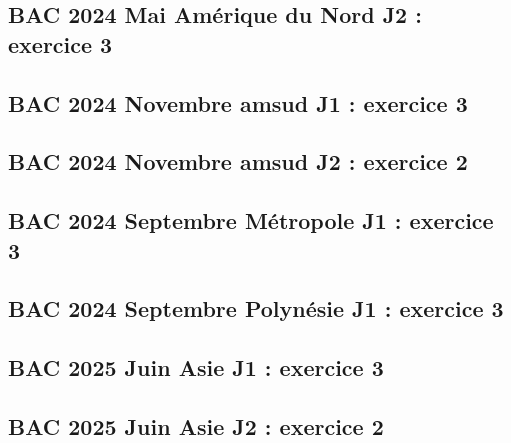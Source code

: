 \documentclass[lang=fr,edition=teacher,layout=sheet]{mxbook}
\begin{document}
\begingroup\endgroup
\par\bigskip
{}\subsection*{BAC 2024 Mai Amérique du Nord J2 : exercice 3}
\begingroup\endgroup
\par\bigskip
{}\subsection*{BAC 2024 Novembre amsud J1 : exercice 3}
\begingroup\endgroup
\par\bigskip
{}\subsection*{BAC 2024 Novembre amsud J2 : exercice 2}
\begingroup\endgroup
\par\bigskip
{}\subsection*{BAC 2024 Septembre Métropole J1 : exercice 3}
\begingroup\endgroup
\par\bigskip
{}\subsection*{BAC 2024 Septembre Polynésie J1 : exercice 3}
\begingroup\endgroup
\par\bigskip
{}\subsection*{BAC 2025 Juin Asie J1 : exercice 3}
\begingroup\endgroup
\par\bigskip
{}\subsection*{BAC 2025 Juin Asie J2 : exercice 2}
\end{document}
